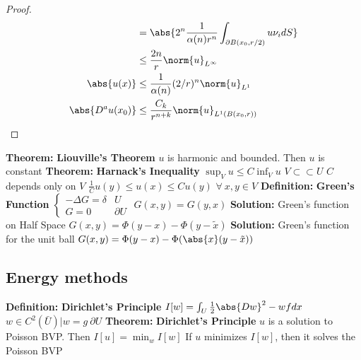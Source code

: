 \documentclass[14pt]{extarticle}
\def\Definition{{\color{blue} \textbf{Definition:} }}
\def\Theorem{{\color{red} \textbf{Theorem:} }}
\def\Solution{{\color{cyan} \textbf{Solution:} }}
\begin{document}
\begin{outline}
\begin{proof}
\begin{align*}
																 &= \abs{2^n\frac{1}{\alpha(n)r^n}\int_{\partial B(x_0,r/2)}u \nu_i dS} \\
																 &\le \frac{2n}{r}\norm{u}_{L^{\infty}} \\
							\abs{u(x)} &\le \frac{1}{\alpha(n)}(2/r)^n \norm{u}_{L^1} \\
				 \abs{D^au(x_0)} &\le \frac{C_k}{r^{n+k}}\norm{u}_{L^1(B(x_0,r))}
						\end{align*}
					\end{proof}
		\1	\Theorem \textbf{Liouville's Theorem}
			\2	$u$ is harmonic and bounded.  Then $u$ is constant
		\1	\Theorem \textbf{Harnack's Inequality}
			\2	$\sup_V u \le C \inf_V u$
				\3	$V \subset \subset U$
				\3	$C$ depends only on $V$
			\2	$\frac{1}{C}u(y) \le u(x) \le Cu(y)$
				\3	$\forall~x,y \in V$
		\1	\Definition \textbf{Green's Function}
			\2	$\begin{cases}
							-\Delta G = \delta & U \\
							G = 0 & \partial U
						\end{cases}$
				\3	$G(x,y) = G(y,x)$
			\2 \Solution Green's function on Half Space
				\3	$G(x,y) = \Phi(y-x) - \Phi(y - \tilde{x})$
			\2	\Solution Green's function for the unit ball
				\3	$G(x,y) = \Phi(y-x) - \Phi(\abs{x}(y - \tilde{x}))$
	\subsection*{Energy methods}
		\1	\Definition \textbf{Dirichlet's Principle}
			\2	$I[w] = \int_U \frac{1}{2}\abs{D w}^2 - wf dx$
				\3	$w \in C^2(\bar{U}) | w = g~\partial U$
		\1	\Theorem \textbf{Dirichlet's Principle}
			\2	$u$ is a solution to Poisson BVP.  Then
					$I[u] = \min_{w} I[w]$
			\2	If $u$ minimizes $I[w]$, then it solves the Poisson BVP

\end{outline}
\end{document}
